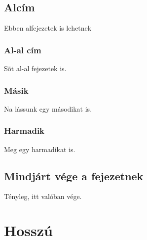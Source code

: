 \documentclass[12pt]{report}
\theoremstyle{definition}
\begin{document}
\section{Alcím}
Ebben alfejezetek is lehetnek

\subsection{Al-al cím}
Sõt al-al fejezetek is.

\subsection{Másik}
Na lássunk egy másodikat is.

\subsection{Harmadik}
Meg egy harmadikat is.

\section{Mindjárt vége a fejezetnek}
Tényleg, itt valóban vége.


\chapter{Hosszú}
\end{document}
